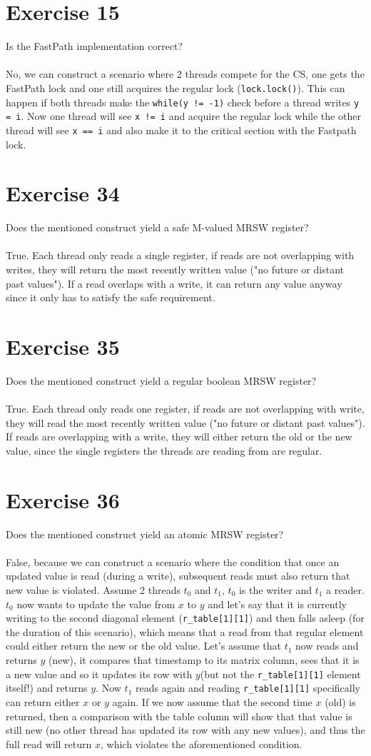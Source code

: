 \documentclass[a4paper,%
11pt,%
DIV=14,
headsepline,%
headings=normal,
]{scrartcl}
\newcommand{\exercise}[1]{\section*{Exercise #1}}
\begin{document}
\exercise{15}

Is the FastPath implementation correct?\\
\\
No, we can construct a scenario where 2 threads compete for the CS, one gets the FastPath lock and one still acquires the regular lock (\texttt{lock.lock()}). This can happen if both threads make the \texttt{while(y != -1)} check before a thread writes \texttt{y = i}. Now one thread will see \texttt{x != i} and acquire the regular lock while the other thread will see \texttt{x == i} and also make it to the critical section with the Fastpath lock.

\exercise{34}

Does the mentioned construct yield a safe M-valued MRSW register?\\
\\
True. Each thread only reads a single register, if reads are not overlapping with writes, they will return the most recently written value ("no future or distant past values"). If a read overlaps with a write, it can return any value anyway since it only has to satisfy the safe requirement.

\exercise{35}

Does the mentioned construct yield a regular boolean MRSW register?\\
\\
True. Each thread only reads one register, if reads are not overlapping with write, they will read the most recently written value ("no future or distant past values"). If reads are overlapping with a write, they will either return the old or the new value, since the single registers the threads are reading from are regular.

\exercise{36}

Does the mentioned construct yield an atomic MRSW register?\\
\\
False, because we can construct a scenario where the condition that once an updated value is read (during a write), subsequent reads must also return that new value is violated. Assume 2 threads $t_0$ and $t_1$, $t_0$ is the writer and $t_1$ a reader. $t_0$ now wants to update the value from $x$ to $y$ and let's say that it is currently writing to the second diagonal element (\texttt{r\_table[1][1]}) and then falls asleep (for the duration of this scenario), which means that a read from that regular element could either return the new or the old value. Let's assume that $t_1$ now reads and returns $y$ (new), it compares that timestamp to its matrix column, sees that it is a new value and so it updates its row with $y$(but not the \texttt{r\_table[1][1]} element itself!) and returns $y$. Now $t_1$ reads again and reading \texttt{r\_table[1][1]} specifically can return either $x$ or $y$ again. If we now assume that the second time $x$ (old) is returned, then a comparison with the table column will show that that value is still new (no other thread has updated its row with any new values), and thus the full read will return $x$, which violates the aforementioned condition.
\end{document}
